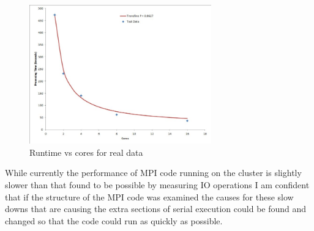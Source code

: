 \begin{figure}[ht]
	\begin{center}
		\includegraphics[width=0.7\textwidth]{Capture}
	\end{center}
	\caption{Runtime vs cores for real data}
	\label{real_data}
\end{figure}

While currently the performance of MPI code running on the cluster is slightly slower than that found to be possible by measuring IO operations I am confident that if the structure  of the MPI code was examined the causes for these slow downs that are causing the extra sections of serial execution could be found and changed so that the code could run as quickly as possible.
